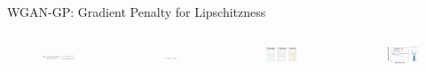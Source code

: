 \begin{frame}[allowframebreaks]{WGAN-GP: Gradient Penalty for Lipschitzness}
\framebreak
\begin{columns}
    \begin{figure}
        \centering
        \includegraphics[height=0.8\textheight, width=\textwidth, keepaspectratio]{images/gan/wgan-gp/slide_85_3_img.png}
    \end{figure}
    \begin{figure}
        \centering
        \includegraphics[height=0.1\textheight, width=\textwidth, keepaspectratio]{images/gan/wgan-gp/slide_85_4_img.png}
    \end{figure}
    \begin{figure}
        \centering
        \includegraphics[height=0.8\textheight, width=1.05\textwidth, keepaspectratio]{images/gan/wgan-gp/slide_85_2_img.png}
    \end{figure}
    \begin{figure}
        \centering
        \includegraphics[height=0.8\textheight, width=1.05\textwidth, keepaspectratio]{images/gan/wgan-gp/slide_85_1_img.png}
    \end{figure}
\end{columns}
\end{frame}

